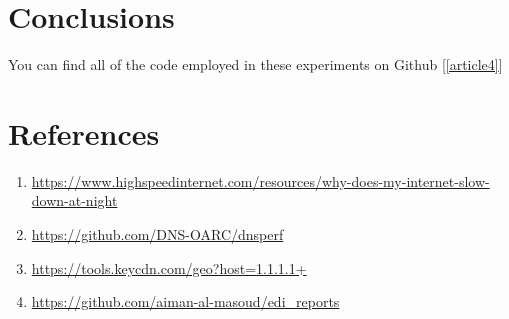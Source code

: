 \documentclass[a4paper,10pt]{article}
\begin{document}
\clearpage

\section{Conclusions}

You can find all of the code employed in these experiments on Github [\ref{article4}] 


\section{References}

\begin{enumerate}

\item \label{article1}  \url{https://www.highspeedinternet.com/resources/why-does-my-internet-slow-down-at-night} 

\item \label{article2}  \url{https://github.com/DNS-OARC/dnsperf} 


\item \label{article3}  \url{https://tools.keycdn.com/geo?host=1.1.1.1+} 

\item \label{article4}  \url{https://github.com/aiman-al-masoud/edi_reports} 


\end{enumerate}
\end{document}
